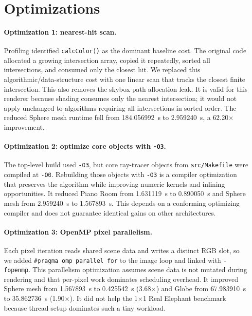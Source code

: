 \documentclass[sigplan,screen]{acmart}
\begin{document}
\section{Optimizations}

\paragraph{Optimization 1: nearest-hit scan.}
Profiling identified \texttt{calcColor()} as the dominant baseline cost. The
original code allocated a growing intersection array, copied it repeatedly,
sorted all intersections, and consumed only the closest hit. We replaced
this algorithmic/data-structure cost with one linear scan that tracks the
closest finite intersection. This also removes the skybox-path allocation
leak. It is valid for this renderer because shading consumes only the
nearest intersection; it would not apply unchanged to algorithms requiring
all intersections in sorted order. The reduced Sphere mesh runtime fell
from 184.056992~s to 2.959240~s, a 62.20$\times$ improvement.

\paragraph{Optimization 2: optimize core objects with \texttt{-O3}.}
The top-level build used \texttt{-O3}, but core ray-tracer objects from
\texttt{src/Makefile} were compiled at \texttt{-O0}. Rebuilding those
objects with \texttt{-O3} is a compiler optimization that preserves the
algorithm while improving numeric kernels and inlining opportunities. It
reduced Piano Room from 1.631119~s to 0.890050~s and Sphere mesh from
2.959240~s to 1.567893~s. This depends on a conforming optimizing compiler
and does not guarantee identical gains on other architectures.

\paragraph{Optimization 3: OpenMP pixel parallelism.}
Each pixel iteration reads shared scene data and writes a distinct RGB slot,
so we added \texttt{\#pragma omp parallel for} to the image loop and linked
with \texttt{-fopenmp}. This parallelism optimization assumes scene data is
not mutated during rendering and that per-pixel work dominates scheduling
overhead. It improved Sphere mesh from 1.567893~s to 0.425542~s (3.68$\times$)
and Globe from 67.983910~s to 35.862736~s (1.90$\times$). It did not help
the 1$\times$1 Real Elephant benchmark because thread setup dominates such
a tiny workload.
\end{document}
